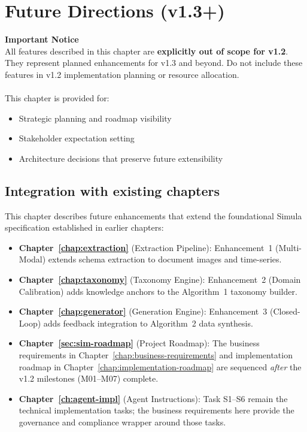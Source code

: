 \documentclass[12pt,a4paper,twoside]{report}
\begin{document}
\chapter{Future Directions (v1.3+)}
\label{chap:future-directions}

\begin{futurebox}
\textbf{Important Notice}\\
All features described in this chapter are \textbf{explicitly out of scope for v1.2}. They represent planned enhancements for v1.3 and beyond. Do not include these features in v1.2 implementation planning or resource allocation.\\
\\
This chapter is provided for:
\begin{itemize}
\item Strategic planning and roadmap visibility
\item Stakeholder expectation setting
\item Architecture decisions that preserve future extensibility
\end{itemize}
\end{futurebox}

\section*{Integration with existing chapters}

This chapter describes future enhancements that extend the foundational Simula specification established in earlier chapters:

\begin{itemize}
\item \textbf{Chapter~\ref{chap:extraction}} (Extraction Pipeline): Enhancement~1
(Multi-Modal) extends schema extraction to document images and time-series.
\item \textbf{Chapter~\ref{chap:taxonomy}} (Taxonomy Engine): Enhancement~2
(Domain Calibration) adds knowledge anchors to the Algorithm~1 taxonomy builder.
\item \textbf{Chapter~\ref{chap:generator}} (Generation Engine): Enhancement~3
(Closed-Loop) adds feedback integration to Algorithm~2 data synthesis.
\item \textbf{Chapter~\ref{sec:sim-roadmap}} (Project Roadmap): The business
requirements in Chapter~\ref{chap:business-requirements} and implementation
roadmap in Chapter~\ref{chap:implementation-roadmap} are sequenced \emph{after}
the v1.2 milestones (M01--M07) complete.
\item \textbf{Chapter~\ref{ch:agent-impl}} (Agent Instructions): Task S1--S6
remain the technical implementation tasks; the business requirements here
provide the governance and compliance wrapper around those tasks.
\end{itemize}
\end{document}
